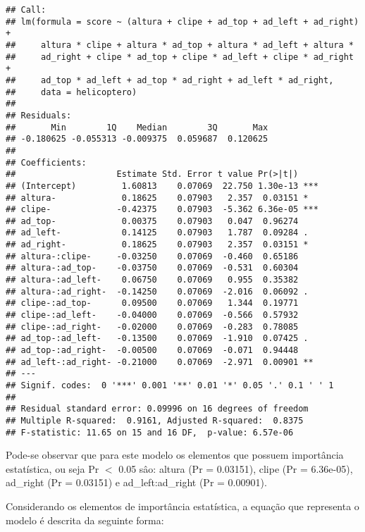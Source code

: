 \begin{knitrout}
\color{fgcolor}\begin{kframe}
\begin{verbatim}
## Call:
## lm(formula = score ~ (altura + clipe + ad_top + ad_left + ad_right) + 
##     altura * clipe + altura * ad_top + altura * ad_left + altura * 
##     ad_right + clipe * ad_top + clipe * ad_left + clipe * ad_right + 
##     ad_top * ad_left + ad_top * ad_right + ad_left * ad_right, 
##     data = helicoptero)
## 
## Residuals:
##       Min        1Q    Median        3Q       Max 
## -0.180625 -0.055313 -0.009375  0.059687  0.120625 
## 
## Coefficients:
##                    Estimate Std. Error t value Pr(>|t|)    
## (Intercept)         1.60813    0.07069  22.750 1.30e-13 ***
## altura-             0.18625    0.07903   2.357  0.03151 *  
## clipe-             -0.42375    0.07903  -5.362 6.36e-05 ***
## ad_top-             0.00375    0.07903   0.047  0.96274    
## ad_left-            0.14125    0.07903   1.787  0.09284 .  
## ad_right-           0.18625    0.07903   2.357  0.03151 *  
## altura-:clipe-     -0.03250    0.07069  -0.460  0.65186    
## altura-:ad_top-    -0.03750    0.07069  -0.531  0.60304    
## altura-:ad_left-    0.06750    0.07069   0.955  0.35382    
## altura-:ad_right-  -0.14250    0.07069  -2.016  0.06092 .  
## clipe-:ad_top-      0.09500    0.07069   1.344  0.19771    
## clipe-:ad_left-    -0.04000    0.07069  -0.566  0.57932    
## clipe-:ad_right-   -0.02000    0.07069  -0.283  0.78085    
## ad_top-:ad_left-   -0.13500    0.07069  -1.910  0.07425 .  
## ad_top-:ad_right-  -0.00500    0.07069  -0.071  0.94448    
## ad_left-:ad_right- -0.21000    0.07069  -2.971  0.00901 ** 
## ---
## Signif. codes:  0 '***' 0.001 '**' 0.01 '*' 0.05 '.' 0.1 ' ' 1
## 
## Residual standard error: 0.09996 on 16 degrees of freedom
## Multiple R-squared:  0.9161,	Adjusted R-squared:  0.8375 
## F-statistic: 11.65 on 15 and 16 DF,  p-value: 6.57e-06
\end{verbatim}
\end{kframe}
\end{knitrout}

Pode-se observar que para este modelo os elementos que possuem importância estatística, ou seja Pr $<$ 0.05 sâo: altura (Pr = 0.03151), clipe (Pr = 6.36e-05), ad\_right (Pr = 0.03151) e ad\_left:ad\_right (Pr = 0.00901). 

Considerando os elementos de importância estatística, a equação que representa o modelo é descrita da seguinte forma:

